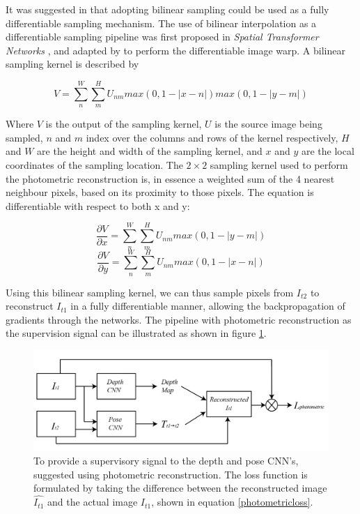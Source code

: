 \documentclass[openany]{book}
\begin{document}
It was suggested in \cite{zhou2017unsupervised} that adopting bilinear sampling could be used as a fully differentiable sampling mechanism. The use of bilinear interpolation as a differentiable sampling pipeline was first proposed in \textit{Spatial Transformer Networks} \cite{jaderberg2015spatialtransformer}, and adapted by \cite{zhou2017unsupervised} to perform the differentiable image warp. A bilinear sampling kernel is described by 

\begin{equation}
    V = \sum_n^W \sum_m^H U_{nm} max (0, 1-|x - n|) max(0, 1-|y - m|)
\end{equation}

Where $V$ is the output of the sampling kernel, $U$ is the source image being sampled, $n$ and $m$ index over the columns and rows of the kernel respectively, $H$ and $W$ are the height and width of the sampling kernel, and $x$ and $y$ are the local coordinates of the sampling location. The $2 \times 2$ sampling kernel used to perform the photometric reconstruction is, in essence a weighted sum of the 4 nearest neighbour pixels, based on its proximity to those pixels. The equation is differentiable with respect to both x and y:


\begin{equation}
    \frac{\partial{V}}{\partial{x}} = \sum_n^W \sum_m^H U_{nm} max(0, 1-|y - m|)
\end{equation}
\begin{equation}
    \frac{\partial{V}}{\partial{y}} = \sum_n^W \sum_m^H U_{nm} max(0, 1-|x - n|)
\end{equation}

Using this bilinear sampling kernel, we can thus sample pixels from $I_{t2}$ to reconstruct $I_{t1}$ in a fully differentiable manner, allowing the backpropagation of gradients through the networks. The pipeline with photometric reconstruction as the supervision signal can be illustrated as shown in figure \ref{supervisedMLCNNS}.


\begin{figure}
    \centering 
    \includegraphics[width=5in]{images/mlpipeline.png}
    \caption{To provide a supervisory signal to the depth and pose CNN's, \cite{garg2016unsupervised} suggested using photometric reconstruction. The loss function is formulated by taking the difference between the reconstructed image $\hat{I_{t1}}$ and the actual image $I_{t1}$, shown in equation \ref{photometricloss}.}
    \label{supervisedMLCNNS}
\end{figure}
\end{document}
